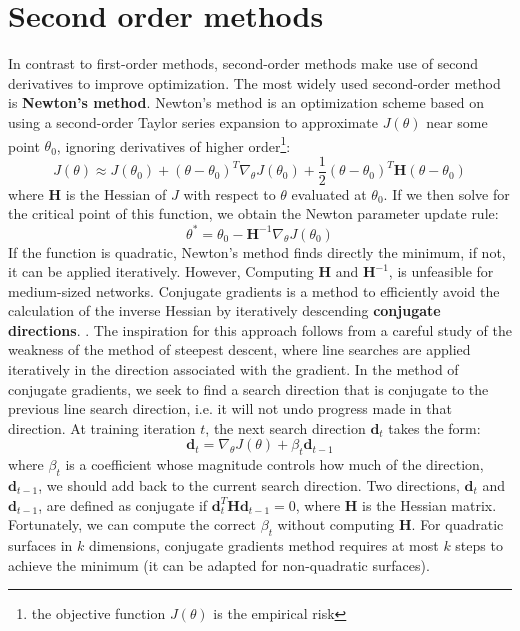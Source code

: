 \section{Second order methods}
In contrast to first-order methods, second-order methods make use of second derivatives to improve optimization. The most widely used second-order method is \textbf{Newton’s method}. Newton’s method is an optimization scheme based on using a second-order Taylor series expansion to approximate $J(\theta)$ near some point $\theta_0$, ignoring derivatives of higher order\footnote{the objective function $J(\theta)$ is the empirical risk}:
\[J(\theta) \approx J(\theta_0) + (\theta - \theta_0)^T \nabla_\theta J(\theta_0) + \frac{1}{2} (\theta - \theta_0)^T \textbf{H}(\theta - \theta_0)\]
where \textbf{H} is the Hessian of $J$ with respect to $\theta$ evaluated at $\theta_0$. If we then solve for the critical point of this function, we obtain the Newton parameter update rule:
\[\theta^* = \theta_0 - \textbf{H}^{-1}\nabla_\theta J(\theta_0)\]
If the function is quadratic, Newton’s method finds directly the minimum, if not, it can be applied iteratively. However, Computing $\textbf{H}$ and $\textbf{H}^{-1}$, is unfeasible for medium-sized networks.\newline\newline
Conjugate gradients is a method to efficiently avoid the calculation of the inverse Hessian by iteratively descending \textbf{conjugate directions}. . The inspiration for this approach follows from a careful study of the weakness of the method of steepest descent, where line searches are applied iteratively in the direction associated with the gradient.\newline\newline
In the method of conjugate gradients, we seek to find a search direction that is conjugate to the previous line search direction, i.e. it will not undo progress made in that direction. At training iteration $t$, the next search direction $\textbf{d}_t$ takes the form:
\[\textbf{d}_t = \nabla_\theta J(\theta) + \beta_t \textbf{d}_{t-1}\]
where $\beta_t$ is a coefficient whose magnitude controls how much of the direction, $\textbf{d}_{t-1}$, we should add back to the current search direction.\newline\newline
Two directions, $\textbf{d}_t$ and $\textbf{d}_{t-1}$, are defined as conjugate if $\textbf{d}_t^T \textbf{H}\textbf{d}_{t-1} = 0$, where $\textbf{H}$ is the Hessian matrix. Fortunately, we can compute the correct $\beta_t$ without computing $\textbf{H}$.\newline\newline
For quadratic surfaces in $k$ dimensions, conjugate gradients method requires at most $k$ steps to achieve the minimum (it can be adapted for non-quadratic surfaces).


